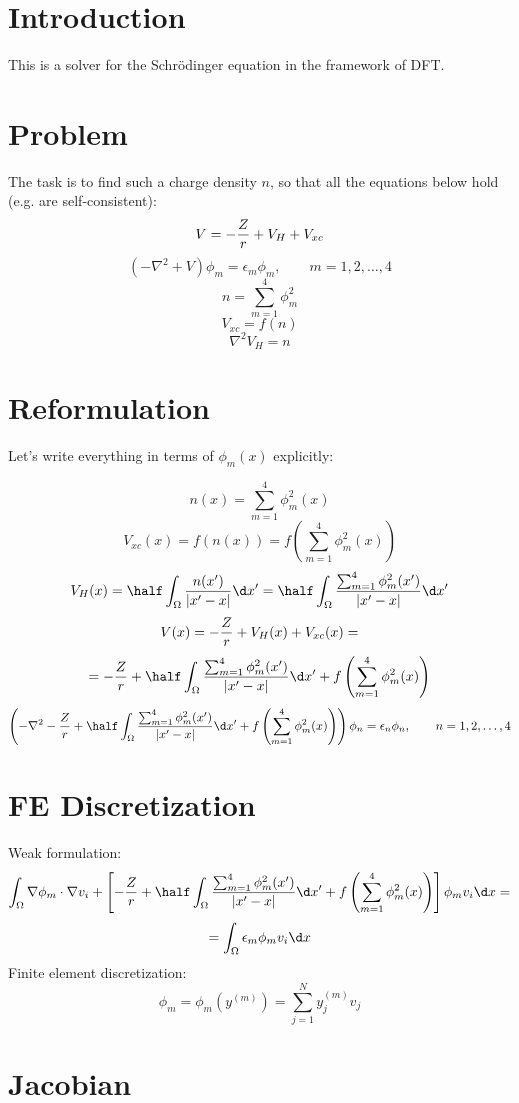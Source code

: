 \documentclass[11pt]{article}
\begin{document}
\section{Introduction}

This is a solver for the Schr\"odinger equation in the framework of DFT.

\section{Problem}

The task is to find such a charge density $n$, so that all the equations below hold (e.g. are
self-consistent):
$$ V = -{Z\over r} + V_H + V_{xc} $$
$$
\left(-\nabla^2+V\right)\phi_m = \epsilon_m\phi_m,\quad\quad m = 1, 2, \dots, 4
$$
$$ n = \sum_{m=1}^4 \phi_m^2 $$
$$ V_{xc} = f(n) $$
$$ \nabla^2 V_H = n $$

\section{Reformulation}

Let's write everything in terms of $\phi_m(x)$ explicitly:

$$n(x) = %
\sum_{m=1}^4 \phi_m^2(x)$$
$$V_{xc}(x) = f(n(x)) = f\left( \sum_{m=1}^4\phi_m^2(x) \right)$$
$$V_H(x) = \half \int_\Omega {n(x')\over|x' - x|}\d x'=
\half \int_\Omega {
\sum_{m=1}^4 \phi_m^2(x')
\over|x' - x|}\d x'
$$
$$V(x) = -{Z\over r} + V_H(x) + V_{xc}(x)=$$
$$
=-{Z\over r}+
\half \int_\Omega {
\sum_{m=1}^4 \phi_m^2(x')
\over|x' - x|}\d x'
+f\left( \sum_{m=1}^4\phi_m^2(x) \right)
$$
$$
\left(-\nabla^2
-{Z\over r}+
\half \int_\Omega {
\sum_{m=1}^4 \phi_m^2(x')
\over|x' - x|}\d x'
+f\left( \sum_{m=1}^4\phi_m^2(x) \right)
\right)\phi_n = \epsilon_n\phi_n,\quad\quad n = 1, 2, \dots, 4
$$

\section{FE Discretization}

Weak formulation:
$$
\int_\Omega \nabla\phi_m\cdot\nabla v_i+\left[
-{Z\over r}+
\half \int_\Omega {
\sum_{m=1}^4 \phi_m^2(x')
\over|x' - x|}\d x'
+f\left( \sum_{m=1}^4\phi_m^2(x) \right)
\right]
\phi_m v_i  \d x=
$$
$$
=\int_\Omega
\epsilon_m\phi_m v_i \d x
$$
Finite element discretization:
$$\phi_m = \phi_m(y^{(m)}) = \sum_{j=1}^N y_j^{(m)} v_j$$

\section{Jacobian}
\end{document}
